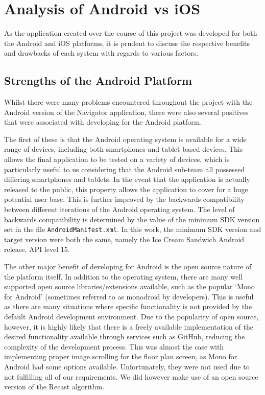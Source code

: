 \documentclass[main.tex]{subfiles}
\begin{document}
    \section{Analysis of Android vs iOS}
        As the application created over the course of this project was developed for both the Android and iOS platforms, it is prudent to discuss
        the respective benefits and drawbacks of each system with regards to various factors.
        \subsection{Strengths of the Android Platform}
            Whilst there were many problems encountered throughout the project with the Android version of the Navigator application, there were also several
            positives that were associated with developing for the Android platform.
            
            The first of these is that the Android operating system is available for a wide range of devices, including both smartphones and tablet based devices. This allows
            the final application to be tested on a variety of devices, which is particularly useful to us considering that the Android sub-team all possessed differing smartphones
            and tablets. In the event that the application is actually released to the public, this property allows the application to cover for a huge potential user base. This is further
            improved by the backwards compatibility between different iterations of the Android operating system. The level of backwards compatibility is determined by the
            value of the minimum SDK version set in the file \texttt{AndroidManifest.xml}. In this work, the minimum SDK version and target version were both the same, namely
            the Ice Cream Sandwich Android release, API level 15.
            
            The other major benefit of developing for Android is the open source nature of the platform itself. In addition to the operating system, there are many well supported
            open source libraries/extensions available, such as the popular `Mono for Android' (sometimes referred to as monodroid by developers). This is useful as there are many
            situations where specific functionality is not provided by the default Android development environment. Due to the popularity of open  source, however, it is highly likely
            that there is a freely available implementation of the desired functionality available through services such as GitHub, reducing the complexity of the development process.
            This was almost the case with implementing proper
            image scrolling for the floor plan screen, as Mono for Android had some options available. Unfortunately, they were not used due to not fulfilling all of our requirements.
            We did however make use of an open source version of the Recast algorithm.
\end{document}
